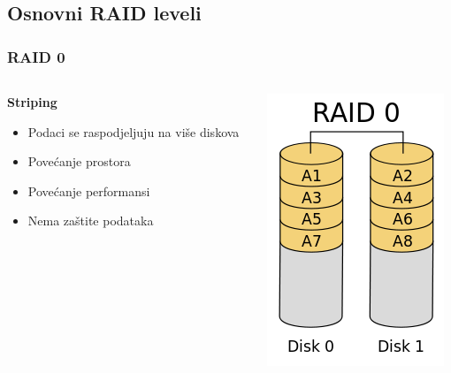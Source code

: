 \documentclass[t]{beamer}
\begin{document}
\subsection{Osnovni RAID leveli}
\begin{frame}
	\frametitle{RAID 0}
	
	\begin{columns}[T]
	\begin{column}{0.6\textwidth}
		\textbf{Striping}
		\begin{itemize}
			\item Podaci se raspodjeljuju na više diskova
		\end{itemize}
		\begin{itemize}
			\item Povećanje prostora
			\item Povećanje performansi
			\item Nema zaštite podataka
		\end{itemize}
	\end{column}
	\begin{column}{0.3\textwidth}
		\includegraphics[width=\textwidth]{200px-RAID_0.png}
	\end{column}
	\end{columns}
\end{frame}
\end{document}
